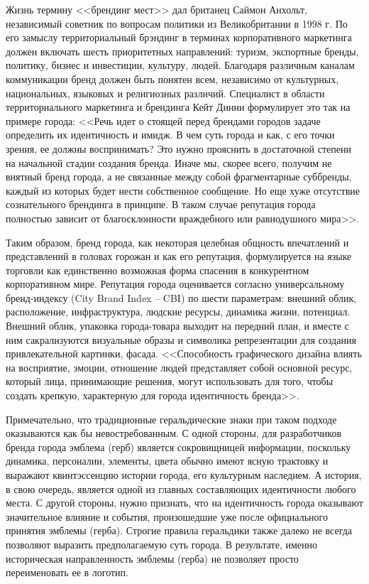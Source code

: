Жизнь термину <<брендинг мест>> дал британец Саймон Анхольт, независимый советник по вопросам
политики из Великобритании в 1998 г. По его замыслу территориальный брэндинг в терминах
корпоративного маркетинга должен включать шесть приоритетных направлений: туризм, экспортные бренды,
политику, бизнес и инвестиции, культуру, людей. Благодаря различным каналам коммуникации бренд
должен быть понятен всем, независимо от культурных, национальных, языковых и религиозных
различий. Специалист в области территориального маркетинга и брендинга Кейт Динни формулирует это
так на примере города: <<Речь идет о стоящей перед брендами городов задаче определить их идентичность
и имидж. В чем суть города и как, с его точки зрения, ее должны воспринимать? Это нужно прояснить в
достаточной степени на начальной стадии создания бренда. Иначе мы, скорее всего, получим не внятный
бренд города, а не связанные между собой фрагментарные суббренды, каждый из которых будет нести
собственное сообщение. Но еще хуже отсутствие сознательного брендинга в принципе. В таком случае
репутация города полностью зависит от благосклонности враждебного или равнодушного
мира>>. \autocite[][127-128]{book:dinni}

Таким образом, бренд города, как некоторая  целебная общность впечатлений и представлений в головах
горожан и как его репутация, формулируется на языке торговли  как единственно возможная форма
спасения в конкурентном корпоративном мире. Репутация города оценивается согласно универсальному
бренд-индексу (City Brand Index -- CBI) по шести параметрам: внешний облик, расположение,
инфраструктура, людские ресурсы, динамика жизни, потенциал. Внешний облик, упаковка города-товара
выходит на передний план,  и вместе с ним сакрализуются визуальные образы и символика репрезентации
для создания привлекательной картинки, фасада. <<Способность графического дизайна влиять на
восприятие, эмоции, отношение людей представляет собой основной ресурс, который лица, принимающие
решения, могут использовать для того, чтобы создать крепкую, характерную для города идентичность
бренда>>. \autocite[][267]{book:dinni}

Примечательно, что традиционные геральдические знаки при таком подходе оказываются как бы
невостребованным. С одной стороны, для разработчиков бренда города эмблема (герб) является
сокровищницей информации, поскольку динамика, персоналии, элементы, цвета обычно имеют ясную
трактовку и выражают квинтэссенцию истории города, его культурным наследием. А история, в свою
очередь, является одной из главных составляющих идентичности любого места. С другой стороны, нужно
признать, что на идентичность города оказывают значительное влияние и события, произошедшие уже
после официального принятия эмблемы (герба). Строгие правила геральдики также далеко не всегда
позволяют выразить предполагаемую суть города. В результате, именно историческая направленность
эмблемы (герба) не позволяет просто переименовать ее  в логотип.

